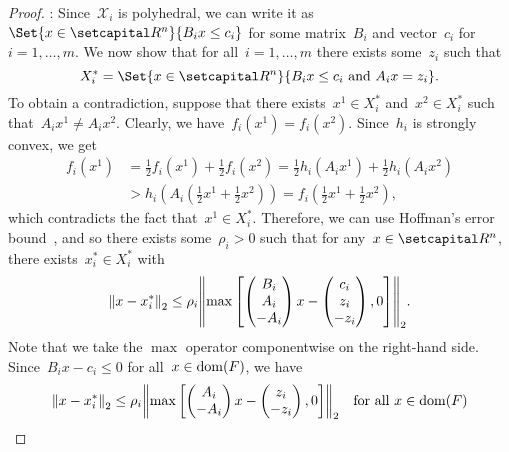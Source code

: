 \documentclass[../main]{subfiles}
\begin{document}
\begin{proof}
    :
    Since~$\mathcal{X}_i$ is polyhedral, we can write it as~$\Set{x \in \setR^n}{B_i x \le c_i}$ for some matrix~$B_i$ and vector~$c_i$ for~$i = 1, \dots, m$.
    We now show that for all~$i = 1, \dots, m$ there exists some~$z_i$ such that
    \begin{equation}
        X_i^* = \Set{x \in \setR^n}{B_i x \le c_i \text{ and } A_i x = z_i}
        .\end{equation}
    To obtain a contradiction, suppose that there exists~$x^1 \in X_i^*$ and~$x^2 \in X_i^*$ such that~$A_i x^1 \neq A_i x^2$.
    Clearly, we have~$f_i(x^1) = f_i(x^2)$.
    Since~$h_i$ is strongly convex, we get
    \begin{align}
        f_i(x^1) & = \frac{1}{2} f_i(x^1) + \frac{1}{2} f_i(x^2) = \frac{1}{2} h_i(A_i x^1) + \frac{1}{2} h_i(A_i x^2)                            \\
                 & > h_i\left( A_i \left( \frac{1}{2} x^1 + \frac{1}{2} x^2 \right) \right) = f_i\left( \frac{1}{2} x^1 + \frac{1}{2} x^2 \right)
        ,\end{align}
    which contradicts the fact that~$x^1 \in X_i^*$.
    Therefore, we can use Hoffman's error bound~\cite{Hoffman1952}, and so there exists some~$\rho_i > 0$ such that for any~$x \in \setR^n$, there exists~$x_i^* \in X_i^*$ with
    \begin{equation}
        \norm*{x - x_i^*}_2 \le \rho_i \norm*{\max \left[ \begin{pmatrix} B_i \\ A_i \\ - A_i \end{pmatrix} x - \begin{pmatrix} c_i \\ z_i \\ - z_i \end{pmatrix}, 0 \right] }_2
        .\end{equation}
    Note that we take the $\max$ operator componentwise on the right-hand side.
    Since~$B_i x - c_i \le 0$ for all~$x \in \operatorname{dom}(F)$, we have
    \begin{equation}
        \norm*{x - x_i^*}_2 \le \rho_i \norm*{\max \left[ \begin{pmatrix} A_i \\ - A_i \end{pmatrix} x - \begin{pmatrix} z_i \\ - z_i \end{pmatrix} , 0 \right] }_2 \forallcondition{x \in \dom(F)}

\end{equation}
\end{proof}
\end{document}
